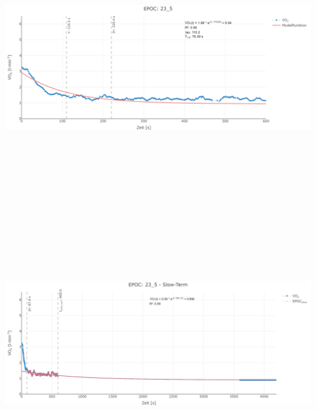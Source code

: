 \documentclass[
  letterpaper,
  DIV=11]{scrartcl}
\begin{document}
\includegraphics[width=11.45833in,height=4.6875in]{images/23_5_tau.png}
\includegraphics[width=11.45833in,height=4.6875in]{images/23_5_slow.png}
\end{document}
